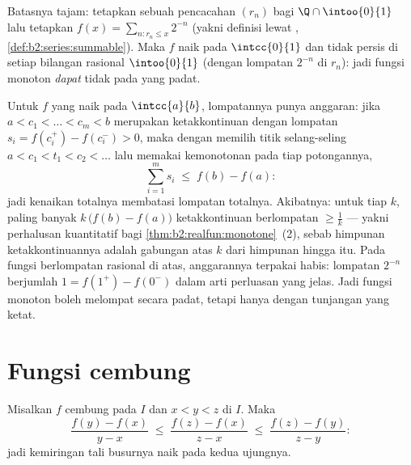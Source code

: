 \begin{example}
Batasnya tajam: tetapkan sebuah pencacahan $(r_n)$ bagi $\Q \cap
\intoo{0}{1}$ lalu tetapkan $f(x) = \sum_{n : r_n \leq x} 2^{-n}$
(yakni definisi lewat ,
\cref{def:b2:series:summable}). Maka $f$ naik pada
$\intcc{0}{1}$ dan tidak  persis di setiap bilangan rasional
$\intoo{0}{1}$ (dengan lompatan $2^{-n}$ di $r_n$): jadi fungsi monoton
\emph{dapat} tidak  pada  yang padat.
\end{example}

\begin{example}\label{ex:b2:realfun:jumpbudget}
Untuk $f$ yang naik pada $\intcc{a}{b}$, lompatannya punya anggaran:
jika $a < c_1 < \dots < c_m < b$ merupakan ketakkontinuan dengan lompatan
$s_i = f(c_i^+) - f(c_i^-) > 0$, maka dengan memilih titik
selang-seling $a < c_1 < t_1 < c_2 < \dots$ lalu memakai kemonotonan
pada tiap potongannya,
\[
\sum_{i=1}^{m} s_i \;\leq\; f(b) - f(a) :
\]
jadi kenaikan totalnya membatasi lompatan totalnya. Akibatnya: untuk
tiap $k$, paling banyak $k\,\bigl(f(b) - f(a)\bigr)$ ketakkontinuan
berlompatan $\geq \frac1k$ --- yakni perhalusan kuantitatif bagi
\cref{thm:b2:realfun:monotone}~(2), sebab himpunan ketakkontinuannya
adalah gabungan  atas $k$ dari himpunan hingga itu. Pada
fungsi berlompatan rasional di atas, anggarannya terpakai habis:
lompatan $2^{-n}$ berjumlah $1 = f(1^+) - f(0^-)$ dalam arti perluasan
yang jelas. Jadi fungsi monoton boleh melompat secara padat, tetapi hanya
dengan tunjangan yang ketat.
\end{example}

\section{Fungsi cembung}

\begin{lemma}\label{lem:b2:realfun:slopes}
Misalkan $f$ cembung pada $I$ dan $x < y < z$ di $I$. Maka
\[
\frac{f(y) - f(x)}{y - x}
\;\leq\; \frac{f(z) - f(x)}{z - x}
\;\leq\; \frac{f(z) - f(y)}{z - y} :
\]
jadi kemiringan tali busurnya naik pada kedua ujungnya.
\end{lemma}

